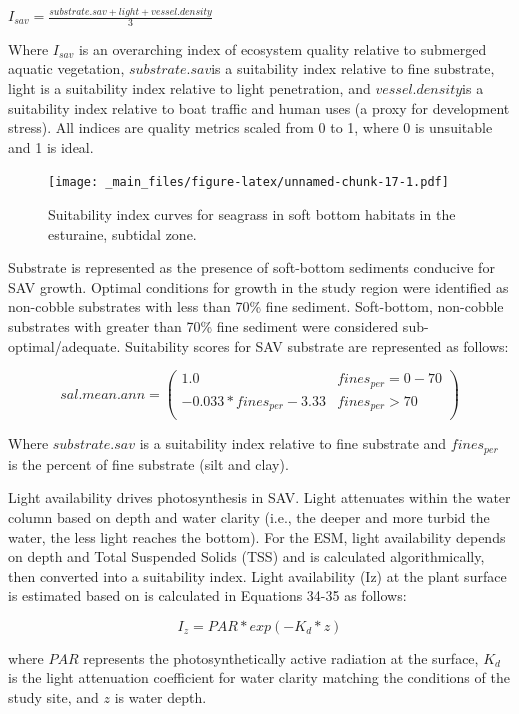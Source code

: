 \documentclass[
]{book}
\begin{document}
\(I_{sav} = \frac{substrate.sav + light + vessel.density}{3}\)

Where \(I_{sav}\) is an overarching index of ecosystem quality relative to submerged aquatic vegetation, \(substrate.sav\)is a suitability index relative to fine substrate, light is a suitability index relative to light penetration, and \(vessel.density\)is a suitability index relative to boat traffic and human uses (a proxy for development stress). All indices are quality metrics scaled from 0 to 1, where 0 is unsuitable and 1 is ideal.

\begin{figure}
\centering
\texttt{[image: \_main\_files/figure-latex/unnamed-chunk-17-1.pdf]}
\caption{\label{fig:unnamed-chunk-17}Suitability index curves for seagrass in soft bottom habitats in the esturaine, subtidal zone.}
\end{figure}

Substrate is represented as the presence of soft-bottom sediments conducive for SAV growth. Optimal conditions for growth in the study region were identified as non-cobble substrates with less than 70\% fine sediment. Soft-bottom, non-cobble substrates with greater than 70\% fine sediment were considered sub-optimal/adequate. Suitability scores for SAV substrate are represented as follows:

\[sal.mean.ann = \begin{pmatrix} 1.0 & fines_{per}=0-70\\
-0.033*fines_{per}-3.33 & fines_{per}>70\\
\end{pmatrix}\]

Where \(substrate.sav\) is a suitability index relative to fine substrate and \(fines_{per}\) is the percent of fine substrate (silt and clay).

Light availability drives photosynthesis in SAV. Light attenuates within the water column based on depth and water clarity (i.e., the deeper and more turbid the water, the less light reaches the bottom). For the ESM, light availability depends on depth and Total Suspended Solids (TSS) and is calculated algorithmically, then converted into a suitability index. Light availability (Iz) at the plant surface is estimated based on \citet{van_nes_charisma_2003} is calculated in Equations 34-35 as follows:

\[I_{z} = PAR * exp(-K_{d}*z)\]

where \(PAR\) represents the photosynthetically active radiation at the surface, \(K_{d}\) is the light attenuation coefficient for water clarity matching the conditions of the study site, and \(z\) is water depth.
\end{document}
